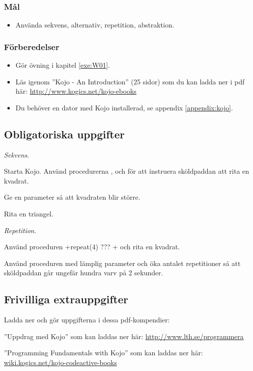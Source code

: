 
\Lab{\LabWeekONE}

\subsubsection{Mål}
\begin{itemize}[nosep]
\item Använda sekvens, alternativ, repetition, abstraktion.
\end{itemize}

\subsubsection{Förberedelser}
\begin{itemize}[nosep]
\item Gör övning {\tt \ExeWeekONE} i kapitel \ref{exe:W01}.
\item Läs igenom ''Kojo - An Introduction'' (25 sidor) som du kan ladda ner i pdf  här: \href{http://www.kogics.net/kojo-ebooks}{http://www.kogics.net/kojo-ebooks}
\item Du behöver en dator med Kojo installerad, se appendix \ref{appendix:kojo}.
\end{itemize}

\subsection{Obligatoriska uppgifter}


\Task \textit{Sekvens}. 

\Subtask Starta Kojo. Använd procedurerna ,  och  för att instruera sköldpaddan att rita en kvadrat.

\Subtask Ge  en parameter så att kvadraten blir större.

\Subtask Rita en triangel.

\Task \textit{Repetition}. 

\Subtask Använd proceduren \code+repeat(4){ ??? }+ och rita en kvadrat.

\Subtask Använd proceduren  med lämplig parameter och öka antalet repetitioner så att sköldpaddan går ungefär hundra varv på 2 sekunder.

\subsection{Frivilliga extrauppgifter}

\Task Ladda ner och gör uppgifterna i dessa pdf-kompendier:

\Subtask ''Uppdrag med Kojo'' som kan laddas ner här: \href{http://fileadmin.cs.lth.se/cs/Personal/Bjorn_Regnell/uppdrag.pdf}{http://www.lth.se/programmera}

\Subtask ''Programming Fundamentals with Kojo'' som kan laddas ner här:\\
 \href{http://wiki.kogics.net/kojo-codeactive-books}{wiki.kogics.net/kojo-codeactive-books}
